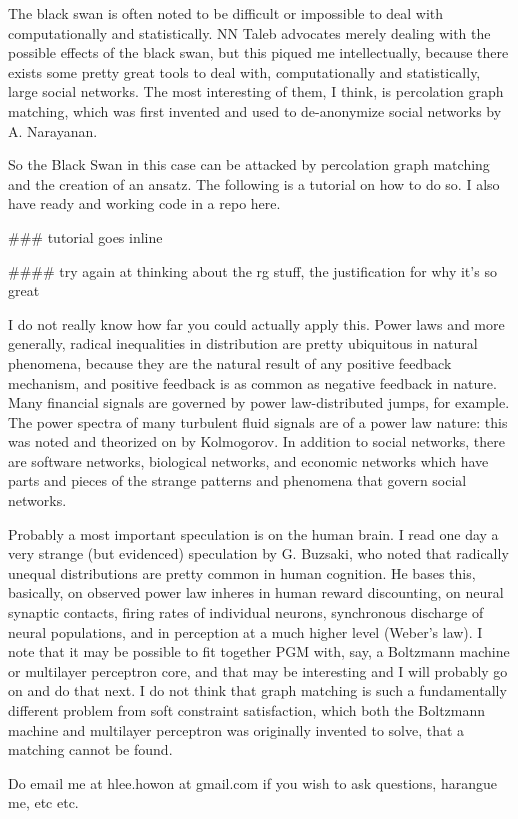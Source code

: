 \documentclass[12pt]{article}
\begin{document}
The black swan is often noted to be difficult or impossible to deal with computationally and statistically. NN Taleb advocates merely dealing with the possible effects of the black swan, but this piqued me intellectually, because there exists some pretty great tools to deal with, computationally and statistically, large social networks. The most interesting of them, I think, is percolation graph matching, which was first invented and used to de-anonymize social networks by A. Narayanan.

So the Black Swan in this case can be attacked by percolation graph matching and the creation of an ansatz. The following is a tutorial on how to do so. I also have ready and working code in a repo here.

### tutorial goes inline

#### try again at thinking about the rg stuff, the justification for why it's so great

I do not really know how far you could actually apply this. Power laws and more generally, radical inequalities in distribution are pretty ubiquitous in natural phenomena, because they are the natural result of any positive feedback mechanism, and positive feedback is as common as negative feedback in nature. Many financial signals are governed by power law-distributed jumps, for example. The power spectra of many turbulent fluid signals are of a power law nature: this was noted and theorized on by Kolmogorov. In addition to social networks, there are software networks, biological networks, and economic networks which have parts and pieces of the strange patterns and phenomena that govern social networks.

Probably a most important speculation is on the human brain. I read one day a very strange (but evidenced) speculation by G. Buzsaki, who noted that radically unequal distributions are pretty common in human cognition. He bases this, basically, on observed power law inheres in human reward discounting, on neural synaptic contacts, firing rates of individual neurons, synchronous discharge of neural populations, and in perception at a much higher level (Weber's law). I note that it may be possible to fit together PGM with, say, a Boltzmann machine or multilayer perceptron core, and that may be interesting and I will probably go on and do that next. I do not think that graph matching is such a fundamentally different problem from soft constraint satisfaction, which both the Boltzmann machine and multilayer perceptron was originally invented to solve, that a matching cannot be found.

Do email me at hlee.howon at gmail.com if you wish to ask questions, harangue me, etc etc.
\end{document}
